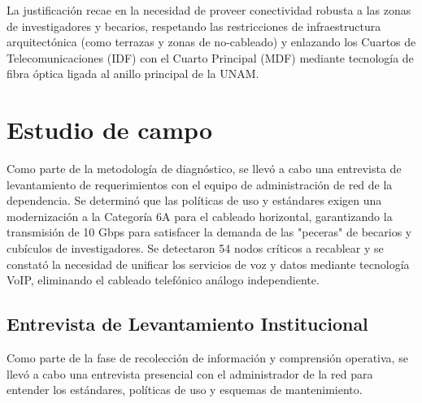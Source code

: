 \documentclass[11pt, letterpaper]{article}
\begin{document}
La justificación recae en la necesidad de proveer conectividad robusta a las zonas de investigadores y becarios, respetando las restricciones de infraestructura arquitectónica (como terrazas y zonas de no-cableado) y enlazando los Cuartos de Telecomunicaciones (IDF) con el Cuarto Principal (MDF) mediante tecnología de fibra óptica ligada al anillo principal de la UNAM.

\section{Estudio de campo}

Como parte de la metodología de diagnóstico, se llevó a cabo una entrevista de levantamiento de requerimientos con el equipo de administración de red de la dependencia. Se determinó que las políticas de uso y estándares exigen una modernización a la Categoría 6A para el cableado horizontal, garantizando la transmisión de 10 Gbps para satisfacer la demanda de las "peceras" de becarios y cubículos de investigadores. Se detectaron 54 nodos críticos a recablear y se constató la necesidad de unificar los servicios de voz y datos mediante tecnología VoIP, eliminando el cableado telefónico análogo independiente.

\subsection{Entrevista de Levantamiento Institucional}

Como parte de la fase de recolección de información y comprensión operativa, se llevó a cabo una entrevista presencial con el administrador de la red para entender los estándares, políticas de uso y esquemas de mantenimiento.
\end{document}
